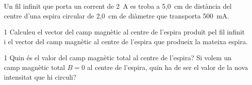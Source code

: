 Un fil infinit que porta un corrent de 2~A es troba a 5,0~cm de distància del centre d'una espira circular de 2,0~cm de diàmetre que transporta 500~mA.


\begin{apartat}{1}
Calculeu el vector del camp magnètic al centre de l'espira produït pel fil infinit i el vector del camp magnètic al centre de l'espira que produeix la mateixa espira.
\end{apartat}

\begin{apartat}{1}
Quin és el valor del camp magnètic total al centre de l'espira? Si volem un camp magnètic total $B = 0$ al centre de l'espira, quin ha de ser el valor de la nova intensitat que hi circuli?
\end{apartat}

